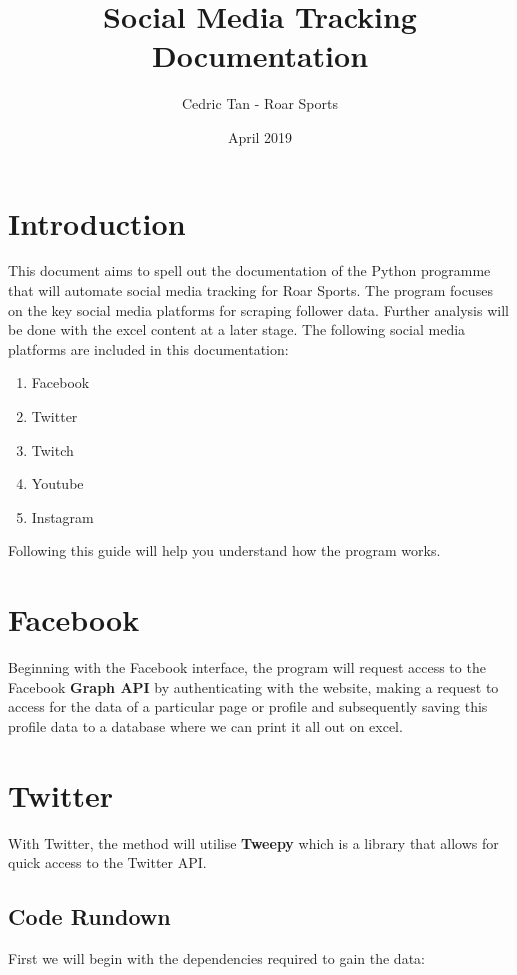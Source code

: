 \documentclass[12pt, letterpaper]{article}
\title{Social Media Tracking Documentation}
\author{Cedric Tan - Roar Sports}
\date{April 2019}
\begin{document}
\maketitle
{}

\newpage

\tableofcontents
\newpage

\section{Introduction}
This document aims to spell out the documentation of the Python programme that will automate social media tracking for Roar Sports. The program focuses on the key social media platforms for scraping follower data. Further analysis will be done with the excel content at a later stage. The following social media platforms are included in this documentation:
\begin{enumerate}
	\item Facebook
	\item Twitter
	\item Twitch
	\item Youtube
	\item Instagram
\end{enumerate}

Following this guide will help you understand how the program works.

\section{Facebook}
Beginning with the Facebook interface, the program will request access to the Facebook \textbf{Graph API} by authenticating with the website, making a request to access for the data of a particular page or profile and subsequently saving this profile data to a database where we can print it all out on excel.


\newpage
\FloatBarrier
\section{Twitter}
With Twitter, the method will utilise \textbf{Tweepy} which is a library that allows for quick access to the Twitter API.
\subsection{Code Rundown}
First we will begin with the dependencies required to gain the data:
\end{document}
